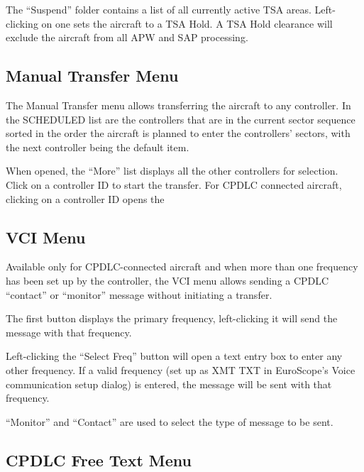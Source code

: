 \documentclass[a4paper,oneside,11pt]{memoir}
\begin{document}
The “Suspend” folder contains a list of all currently active TSA areas. Left-clicking on one sets the aircraft to a TSA Hold. A TSA Hold clearance will exclude the aircraft from all APW and SAP processing.

\subsection{Manual Transfer Menu}
\label{menu:mxfr}


The Manual Transfer menu allows transferring the aircraft to any controller. In the SCHEDULED list are the controllers that are in the current sector sequence sorted in the order the aircraft is planned to enter the controllers’ sectors, with the next controller being the default item.

\bigskip

When opened, the “More” list displays all the other controllers for selection. Click on a controller ID to start the transfer. For CPDLC connected aircraft, clicking on a controller ID opens the 

\subsection{VCI Menu}
\label{menu:vci}


Available only for CPDLC-connected aircraft and when more than one frequency has been set up by the controller, the VCI menu allows sending a CPDLC “contact” or “monitor” message without initiating a transfer.

\bigskip

The first button displays the primary frequency, left-clicking it will send the message with that frequency.

\bigskip

Left-clicking the “Select Freq” button will open a text entry box to enter any other frequency. If a valid frequency (set up as XMT TXT in EuroScope’s Voice communication setup dialog) is entered, the message will be sent with that frequency.

\bigskip

“Monitor” and “Contact” are used to select the type of message to be sent.

\subsection{CPDLC Free Text Menu}
\label{menu:dlftm}
\end{document}
